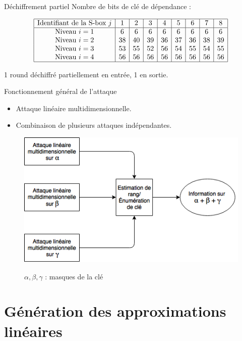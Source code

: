 \documentclass{beamer}
\begin{document}
\begin{frame}{Déchiffrement partiel}
Nombre de bits de clé de dépendance :
\begin{figure}[H]
\[
\begin{array}{|c|c|c|c|c|c|c|c|c|}
	\hline
	\text{Identifiant de la S-box $j$} & 1 & 2 & 3 & 4 & 5 & 6 & 7 & 8\\
	\hline
	\text{Niveau $i=1$} & 6 & 6 & 6 & 6 & 6 & 6 & 6 & 6\\
	\text{Niveau $i=2$} & 38 & 40 & 39 & 36 & 37 & 36 & 38 & 39\\
	\text{Niveau $i=3$} & 53 & 55 & 52 & 56 & 54 & 55 & 54 & 55\\
	\text{Niveau $i=4$} & 56 & 56 & 56 & 56 & 56 & 56 & 56 & 56\\
	\hline
\end{array}
\]
\end{figure}

1 round déchiffré partiellement en entrée, 1 en sortie.
\end{frame}

\begin{frame}{Fonctionnement général de l'attaque}
	\begin{itemize}
	\item Attaque linéaire multidimensionnelle.
	\item Combinaison de plusieurs attaques indépendantes.
	\end{itemize}

	\begin{figure}
		\centering
		\includegraphics[scale=0.6]{multi}

		$\alpha,\beta,\gamma$ : masques de la clé
	\end{figure}
\end{frame}

\section{Génération des approximations linéaires}
\begin{frame}
	\tableofcontents[currentsection]
\end{frame}
\end{document}
